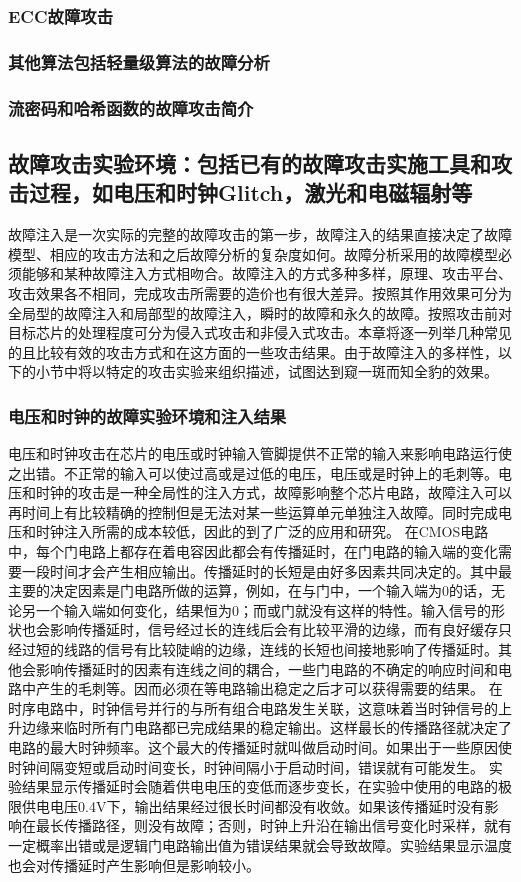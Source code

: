 \documentclass[a4paper,12pt]{article}
\begin{document}
\begin{CJK}{UTF8}{gkai}
\subsubsection{ECC故障攻击}
\subsubsection{其他算法包括轻量级算法的故障分析}
\subsubsection{流密码和哈希函数的故障攻击简介}

\subsection{故障攻击实验环境：包括已有的故障攻击实施工具和攻击过程，如电压和时钟Glitch，激光和电磁辐射等}
故障注入是一次实际的完整的故障攻击的第一步，故障注入的结果直接决定了故障模型、相应的攻击方法和之后故障分析的复杂度如何。故障分析采用的故障模型必须能够和某种故障注入方式相吻合。故障注入的方式多种多样，原理、攻击平台、攻击效果各不相同，完成攻击所需要的造价也有很大差异。按照其作用效果可分为全局型的故障注入和局部型的故障注入，瞬时的故障和永久的故障。按照攻击前对目标芯片的处理程度可分为侵入式攻击和非侵入式攻击。本章将逐一列举几种常见的且比较有效的攻击方式和在这方面的一些攻击结果。由于故障注入的多样性，以下的小节中将以特定的攻击实验来组织描述，试图达到窥一斑而知全豹的效果。

\subsubsection{电压和时钟的故障实验环境和注入结果}

电压和时钟攻击在芯片的电压或时钟输入管脚提供不正常的输入来影响电路运行使之出错。不正常的输入可以使过高或是过低的电压，电压或是时钟上的毛刺等。电压和时钟的攻击是一种全局性的注入方式，故障影响整个芯片电路，故障注入可以再时间上有比较精确的控制但是无法对某一些运算单元单独注入故障。同时完成电压和时钟注入所需的成本较低，因此的到了广泛的应用和研究。
在CMOS电路中，每个门电路上都存在着电容因此都会有传播延时，在门电路的输入端的变化需要一段时间才会产生相应输出。传播延时的长短是由好多因素共同决定的。其中最主要的决定因素是门电路所做的运算，例如，在与门中，一个输入端为0的话，无论另一个输入端如何变化，结果恒为0；而或门就没有这样的特性。输入信号的形状也会影响传播延时，信号经过长的连线后会有比较平滑的边缘，而有良好缓存只经过短的线路的信号有比较陡峭的边缘，连线的长短也间接地影响了传播延时。其他会影响传播延时的因素有连线之间的耦合，一些门电路的不确定的响应时间和电路中产生的毛刺等。因而必须在等电路输出稳定之后才可以获得需要的结果。
在时序电路中，时钟信号并行的与所有组合电路发生关联，这意味着当时钟信号的上升边缘来临时所有门电路都已完成结果的稳定输出。这样最长的传播路径就决定了电路的最大时钟频率。这个最大的传播延时就叫做启动时间。如果出于一些原因使时钟间隔变短或启动时间变长，时钟间隔小于启动时间，错误就有可能发生。
实验结果显示传播延时会随着供电电压的变低而逐步变长，在实验中使用的电路的极限供电电压0.4V下，输出结果经过很长时间都没有收敛。如果该传播延时没有影响在最长传播路径，则没有故障；否则，时钟上升沿在输出信号变化时采样，就有一定概率出错或是逻辑门电路输出值为错误结果就会导致故障。实验结果显示温度也会对传播延时产生影响但是影响较小。


\end{CJK}
\end{document}
